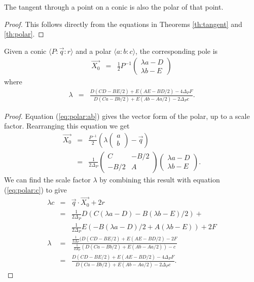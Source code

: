 \begin{corollary}
The tangent through a point on a conic is also the polar of that point.
\end{corollary}
\begin{proof}
This follows directly from the equations in Theorems \ref{th:tangent} and \ref{th:polar}.
\end{proof}

\begin{theorem}Given a conic $\langle P\!:\!\vec{q}\!:\!r \rangle$ and a polar $\langle a\!:\!b\!:\!c \rangle$, the corresponding pole is
\begin{eqnarray}
\vec{X_0} & = & \frac{1}{2}P^{-1}\begin{pmatrix} \lambda a -D\\ \lambda b-E \end{pmatrix}
\end{eqnarray}
where
\begin{eqnarray}
\lambda & = & \frac{D(CD - BE/2) + E(AE - BD/2) - 4\Delta_PF}{D(Ca - Bb/2) + E(Ab - Aa/2) - 2\Delta_Pc}.
\end{eqnarray}
\end{theorem}
\begin{proof}
Equation (\ref{eq:polar:ab}) gives the vector form of the polar, up to a scale factor. Rearranging this equation we get
\begin{eqnarray*}
\vec{X_0} & = & \frac{P^{-1}}{2}\left(\lambda\begin{pmatrix} a \\ b \end{pmatrix} - \vec{q}\right)\\
    & = & \frac{1}{2\Delta_P}\begin{pmatrix}C & -B/2 \\ -B/2 & A \end{pmatrix}\begin{pmatrix} \lambda a -D\\ \lambda b-E \end{pmatrix}.
\end{eqnarray*}
We can find the scale factor $\lambda$ by combining this result with equation (\ref{eq:polar:c}) to give
\begin{eqnarray*}
\lambda c & = & \vec{q}\cdot \vec{X_0} + 2r\\
 & = & \frac{1}{2\Delta_P}D\left(C(\lambda a - D) - B(\lambda b - E)/2\right) + \\
 &   & \frac{1}{2\Delta_P}E(-B(\lambda a - D)/2 + A(\lambda b -E)) + 2F\\
\lambda & = & \frac{\frac{1}{2\Delta_P}(D(CD - BE/2) + E(AE - BD/2) - 2F}{\frac{1}{2\Delta_P}(D(Ca - Bb/2) + E(Ab - Aa/2)) - c}\\
        & = & \frac{D(CD - BE/2) + E(AE - BD/2) - 4\Delta_PF}{D(Ca - Bb/2) + E(Ab - Aa/2) - 2\Delta_Pc}.
\end{eqnarray*}
\end{proof}


